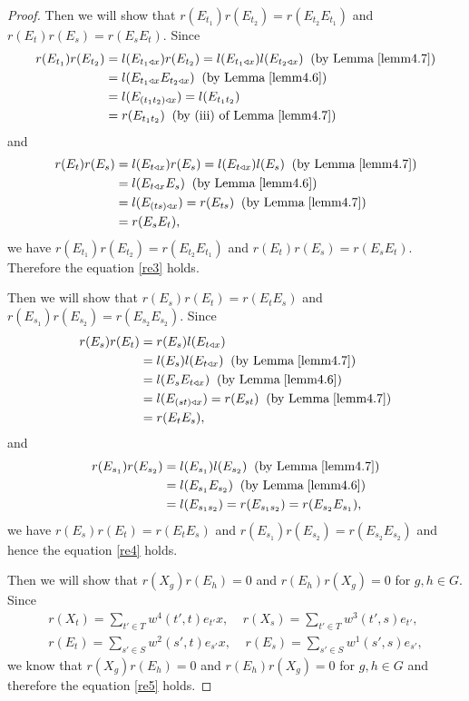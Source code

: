 \documentclass[a4paper,11pt]{amsart}
\numberwithin{equation}{section}
\begin{document}
\begin{proof}
Then we will show that $r(E_{t_1})r(E_{t_2})=r(E_{t_2} E_{t_1})$ and $r(E_t)r(E_s)=r(E_{s}E_{t})$. Since
\begin{align*}
r(E_{t_1})r(E_{t_2})&=l(E_{t_1 \triangleleft x}) r(E_{t_2})=l(E_{t_1 \triangleleft x}) l(E_{t_2 \triangleleft x}) \;\;(\text{by Lemma}\;\ref{lemm4.7})\\
&=l(E_{t_1 \triangleleft x} E_{t_2 \triangleleft x}) \;\;(\text{by Lemma}\;\ref{lemm4.6})\\
&=l(E_{(t_1t_2)\triangleleft x})=l(E_{t_1t_2})\\
&=r(E_{t_1t_2})\;\;(\text{by (iii) of Lemma}\;\ref{lemm4.7})
\end{align*}
and
\begin{align*}
r(E_{t})r(E_{s})&=l(E_{t \triangleleft x}) r(E_s)=l(E_{t \triangleleft x}) l(E_s) \;\;(\text{by Lemma}\;\ref{lemm4.7})\\
&=l(E_{t \triangleleft x} E_s) \;\;(\text{by Lemma}\;\ref{lemm4.6})\\
&=l(E_{(ts)\triangleleft x})=r(E_{ts}) \;\;(\text{by Lemma}\;\ref{lemm4.7})\\
&=r(E_{s} E_{t}),
\end{align*}
we have $r(E_{t_1})r(E_{t_2})=r(E_{t_2} E_{t_1})$ and $r(E_t)r(E_s)=r(E_{s}E_{t})$. Therefore the equation \eqref{re3} holds.

Then we will show that $r(E_s)r(E_t)=r(E_{t}E_s)$ and $r(E_{s_1})r(E_{s_2})=r(E_{s_2} E_{s_2})$. Since
\begin{align*}
r(E_{s})r(E_{t})&=r(E_s) l(E_{t \triangleleft x})\\
&=l(E_s)l(E_{t \triangleleft x}) \;\;(\text{by Lemma}\;\ref{lemm4.7})\\
&=l(E_s E_{t \triangleleft x} ) \;\;(\text{by Lemma}\;\ref{lemm4.6})\\
&=l(E_{(st)\triangleleft x})=r(E_{st}) \;\;(\text{by Lemma}\;\ref{lemm4.7})\\
&=r(E_{t} E_{s}),
\end{align*}
and
\begin{align*}
r(E_{s_1}) r(E_{s_2})&=l(E_{s_1}) l(E_{s_2})\;\;(\text{by Lemma}\;\ref{lemm4.7})\\
&=l(E_{s_1} E_{s_2}) \;\;(\text{by Lemma}\;\ref{lemm4.6})\\
&=l(E_{s_1 s_2})=r(E_{s_1 s_2})=r(E_{s_2} E_{s_1}),
\end{align*}
we have $r(E_s)r(E_t)=r(E_{t}E_s)$ and $r(E_{s_1})r(E_{s_2})=r(E_{s_2} E_{s_2})$ and hence the equation \eqref{re4} holds.

Then we will show that $r(X_g)r(E_h)=0$ and $r(E_h)r(X_g)=0$ for $g,h\in G$. Since
\begin{gather*}
r(X_t)=\sum_{t'\in T} w^4(t',t)e_{t'}x,\;\;\;\;
r(X_s)=\sum_{t'\in T} w^3(t',s)e_{t'},\\
r(E_t)=\sum_{s' \in S} w^2(s',t)e_{s'}x,\;\;\;\;
r(E_s)=\sum_{s'\in S} w^1(s',s)e_{s'},
\end{gather*}
we know that $r(X_g)r(E_h)=0$ and $r(E_h)r(X_g)=0$ for $g,h\in G$ and therefore the equation \eqref{re5} holds.
\end{proof}
\end{document}

